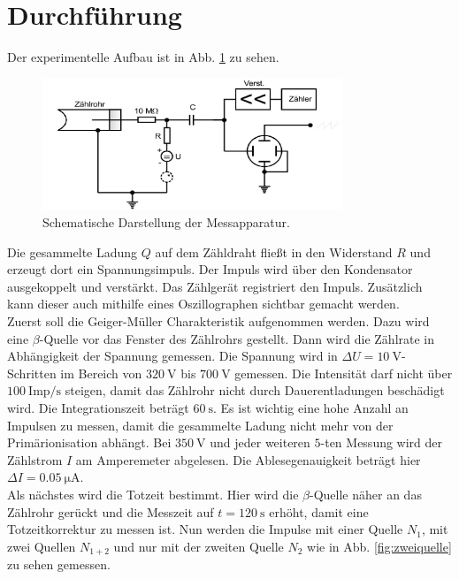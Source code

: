 \section{Durchführung}
\label{sec:Durchführung}
Der experimentelle Aufbau ist in Abb. \ref{fig:aufbau} zu sehen.
\begin{figure}
    \centering
    \includegraphics[width=0.8\textwidth]{content/data/aufbau.jpg}
    \caption{Schematische Darstellung der Messapparatur. \cite[7]{anleitung}}
    \label{fig:aufbau}
\end{figure}
Die gesammelte Ladung $Q$ auf dem Zähldraht fließt in den Widerstand $R$ und erzeugt dort ein Spannungsimpuls.
Der Impuls wird über den Kondensator ausgekoppelt und verstärkt.
Das Zählgerät registriert den Impuls.
Zusätzlich kann dieser auch mithilfe eines Oszillographen sichtbar gemacht werden.
\\
Zuerst soll die Geiger-Müller Charakteristik aufgenommen werden.
Dazu wird eine $\beta$-Quelle vor das Fenster des Zählrohrs gestellt.
Dann wird die Zählrate in Abhängigkeit der Spannung gemessen.
Die Spannung wird in $\Delta U = \SI{10}{\volt}$-Schritten im Bereich von $\SI{320}{\volt}$ bis $\SI{700}{\volt}$ gemessen.
Die Intensität darf nicht über $\SI{100}{\text{Imp}/\second}$ steigen, damit das Zählrohr nicht durch Dauerentladungen beschädigt wird.
Die Integrationszeit beträgt $\SI{60}{\second}$.
Es ist wichtig eine hohe Anzahl an Impulsen zu messen, damit die gesammelte Ladung nicht mehr von der Primärionisation abhängt.
Bei $\SI{350}{\volt}$ und jeder weiteren $5$-ten Messung wird der Zählstrom $I$ am Amperemeter abgelesen.
Die Ablesegenauigkeit beträgt hier $\Delta I = \SI{0.05}{\micro \ampere}$.
\\
Als nächstes wird die Totzeit bestimmt.
Hier wird die $\beta$-Quelle näher an das Zählrohr gerückt und die Messzeit auf $t = \SI{120}{\second}$ erhöht, damit eine Totzeitkorrektur zu messen ist.
Nun werden die Impulse mit einer Quelle $N_1$, mit zwei Quellen $N_{1+2}$ und nur mit der zweiten Quelle $N_{2}$ wie in Abb. \ref{fig:zweiquelle} zu sehen gemessen.
